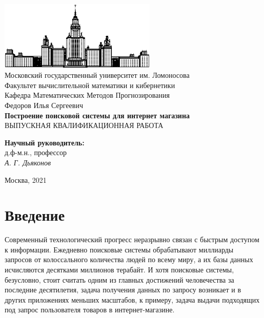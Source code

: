 \documentclass[12pt,a4paper]{article}
\begin{document}
\begin{titlepage}
\begin{center}

    \bigskip
    \includegraphics[width=75mm]{msu.eps}\\
    \bigskip
    Московский государственный университет им. Ломоносова\\
    Факультет вычислительной математики и кибернетики\\
    Кафедра Математических Методов Прогнозирования\\[10mm]
    
    Федоров Илья Сергеевич \\
    \textsf{\large\bfseries
        Построение поисковой системы для интернет магазина
    }\\[10mm]
    
    ВЫПУСКНАЯ КВАЛИФИКАЦИОННАЯ РАБОТА
    \vspace{\fill}
    \begin{flushright}
        \parbox{0.5\textwidth}{
            \textbf{Научный руководитель:}\\
            д.ф-м.н., профессор\\
            \emph{А. Г. Дьяконов}
        }
    \end{flushright}

    \vspace{\fill}
    Москва, 2021
\end{center}
\end{titlepage}

\newpage
\renewcommand{\contentsname}{Содержание}
\addtocounter{page}{1}
\tableofcontents

\newpage
\section{Введение}

Современный технологический прогресс неразрывно связан с быстрым доступом к информации. Ежедневно поисковые системы обрабатывают миллиарды запросов от колоссального количества людей по всему миру, а их базы данных исчисляются десятками миллионов терабайт. И хотя поисковые системы, безусловно, стоит считать одним из главных достижений человечества за последние десятилетия, задача получения данных по запросу возникает и в других приложениях меньших масштабов, к примеру, задача выдачи подходящих под запрос пользователя товаров в интернет-магазине. 
\end{document}
